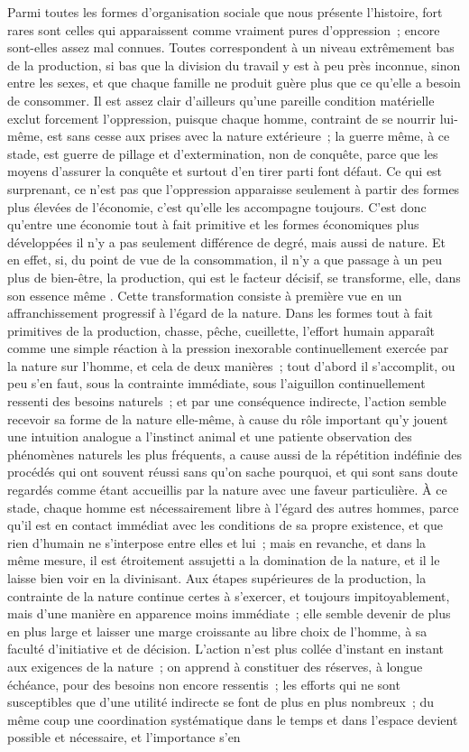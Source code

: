 \documentclass[french,twoside]{book} %
\begin{document}
Parmi toutes les formes d'organisation sociale que nous présente l'histoire, fort rares sont celles qui apparaissent comme vraiment pures d'oppression ; encore sont-elles assez mal connues. Toutes correspondent à un niveau extrêmement bas de la production, si bas que la division du travail y est à peu près inconnue, sinon entre les sexes, et que chaque famille ne produit guère plus que ce qu'elle a besoin de consommer. Il est assez clair d'ailleurs qu'une pareille condition matérielle exclut forcement l'oppression, puisque chaque homme, contraint de se nourrir lui-même, est sans cesse aux prises avec la nature extérieure ; la guerre même, à ce stade, est guerre de pillage et d'extermination, non de conquête, parce que les moyens d'assurer la conquête et surtout d'en tirer parti font défaut. Ce qui est surprenant, ce n'est pas que l'oppression apparaisse seulement à partir des formes plus élevées de l'économie, c'est qu'elle les accompagne toujours. C'est donc qu'entre une économie tout à fait primitive et les formes économiques plus développées il n'y a pas seulement différence de degré, mais aussi de nature. Et en effet, si, du point de vue de la consommation, il n'y a que passage à un peu plus de bien-être, la production, qui est le facteur décisif, se transforme, elle, dans son essence même . Cette transformation consiste à première vue en un affranchissement progressif à l'égard de la nature. Dans les formes tout à fait primitives de la production, chasse, pêche, cueillette, l'effort humain apparaît comme une simple réaction à la pression inexorable continuellement exercée par la nature sur l'homme, et cela de deux manières ; tout d'abord il s'accomplit, ou peu s'en faut, sous la contrainte immédiate, sous l'aiguillon continuellement ressenti des besoins naturels ; et par une conséquence indirecte, l'action semble recevoir sa forme de la nature elle-même, à cause du rôle important qu'y jouent une intuition analogue a l'instinct animal et une patiente observation des phénomènes naturels les plus fréquents, a cause aussi de la répétition indéfinie des procédés qui ont souvent réussi sans qu'on sache pourquoi, et qui sont sans doute regardés comme étant accueillis par la nature avec une faveur particulière. À ce stade, chaque homme est nécessairement libre à l'égard des autres hommes, parce qu'il est en contact immédiat avec les conditions de sa propre existence, et que rien d'humain ne s'interpose entre elles et lui ; mais en revanche, et dans la même mesure, il est étroitement assujetti a la domination de la nature, et il le laisse bien voir en la divinisant. Aux étapes supérieures de la production, la contrainte de la nature continue certes à s'exercer, et toujours impitoyablement, mais d'une manière en apparence moins immédiate ; elle semble devenir de plus en plus large et laisser une marge croissante au libre choix de l'homme, à sa faculté d'initiative et de décision. L'action n'est plus collée d'instant en instant aux exigences de la nature ; on apprend à constituer des réserves, à longue échéance, pour des besoins non encore ressentis ; les efforts qui ne sont susceptibles que d'une utilité indirecte se font de plus en plus nombreux ; du même coup une coordination systématique dans le temps et dans l'espace devient possible et nécessaire, et l'importance s'en 
\end{document}
